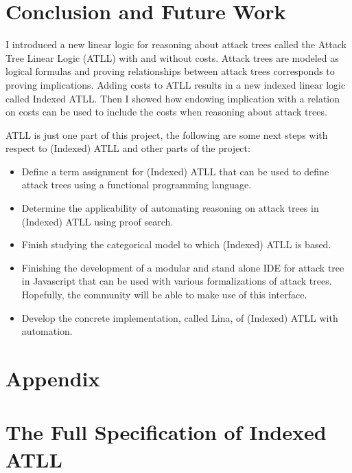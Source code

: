 \documentclass{llncs}
\begin{document}
\section{Conclusion and Future Work}
\label{sec:conclusion}
I introduced a new linear logic for reasoning about attack trees
called the Attack Tree Linear Logic (ATLL) with and without costs.
Attack trees are modeled as logical formulas and proving relationships
between attack trees corresponds to proving implications.  Adding
costs to ATLL results in a new indexed linear logic called Indexed
ATLL.  Then I showed how endowing implication with a relation on costs
can be used to include the costs when reasoning about attack trees.

ATLL is just one part of this project, the following are some next
steps with respect to (Indexed) ATLL and other parts of the project:
\begin{itemize}
\item Define a term assignment for (Indexed) ATLL that can be used to
  define attack trees using a functional programming language.
\item Determine the applicability of automating reasoning on attack
  trees in (Indexed) ATLL using proof search.  
\item Finish studying the categorical model to which (Indexed) ATLL is
  based.
\item Finishing the development of a modular and stand alone IDE for
  attack tree in Javascript that can be used with various
  formalizations of attack trees.  Hopefully, the community will
  be able to make use of this interface.
\item Develop the concrete implementation, called Lina, of (Indexed)
  ATLL with automation.
\end{itemize}





\appendix

\section*{Appendix}
\label{sec:appendix}

\section{The Full Specification of Indexed ATLL}
\label{subsec:the_full_specification_of_indexed_atll}


\end{document}
